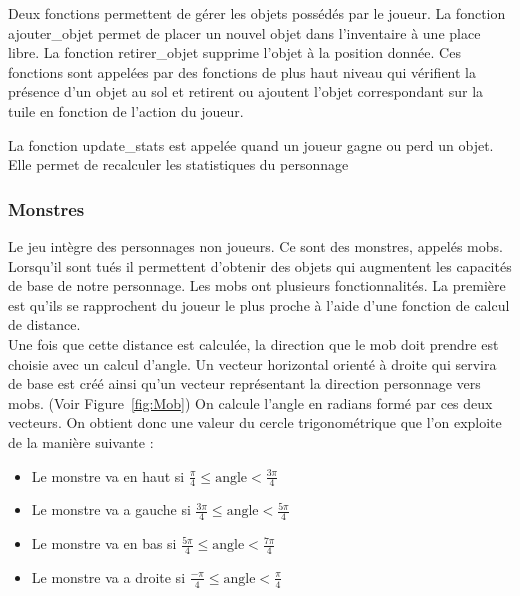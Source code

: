 \documentclass[11pt]{article}
\begin{document}
            Deux fonctions permettent de gérer les objets possédés par le joueur.
            La fonction ajouter\_objet permet de placer un nouvel objet dans l’inventaire à une place libre. La fonction retirer\_objet supprime l’objet à la position donnée.
            Ces fonctions sont appelées par des fonctions de plus haut niveau qui vérifient la présence d’un objet au sol et retirent ou ajoutent l’objet correspondant sur la tuile en fonction de l’action du joueur.

            La fonction update\_stats est appelée quand un joueur gagne ou perd un objet. Elle permet de recalculer les statistiques du personnage

            \subsubsection{Monstres}
            Le jeu intègre des personnages non joueurs.
            Ce sont des monstres, appelés mobs. Lorsqu'il sont tués il permettent d'obtenir des objets qui augmentent les capacités de base de notre personnage.
            Les mobs ont plusieurs fonctionnalités. La première est qu'ils se rapprochent du joueur le plus proche à l'aide d'une fonction de calcul de distance.
            \\
            Une fois que cette distance est calculée, la direction que le mob doit prendre est choisie avec un calcul d'angle. 
            Un vecteur horizontal orienté à droite qui servira de base est créé ainsi qu'un vecteur représentant la direction personnage vers mobs. (Voir Figure~\ref{fig:Mob}) 
            On calcule l'angle en radians formé par ces deux vecteurs.
            On obtient donc une valeur du cercle trigonométrique que l'on exploite de la manière suivante : 
            \begin{itemize}
                \item Le monstre va en haut si   $ \frac{\pi}{4}  \leq \text{angle} < \frac{3\pi}{4} $
                \item Le monstre va a gauche si  $ \frac{3\pi}{4} \leq \text{angle} < \frac{5\pi}{4} $
                \item Le monstre va en bas si    $ \frac{5\pi}{4} \leq \text{angle} < \frac{7\pi}{4} $
                \item Le monstre va a droite si  $ \frac{-\pi}{4} \leq \text{angle} < \frac{\pi}{4} $
            \end{itemize}
\end{document}
